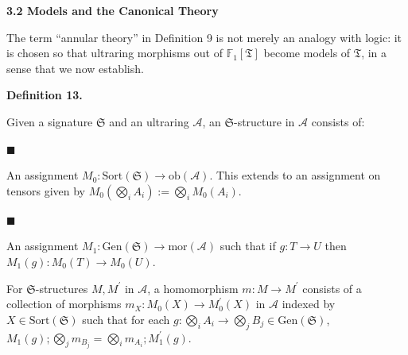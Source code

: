 \documentclass[10pt,a4paper]{amsart}
\begin{document}
 
 
 
 
\par\medskip\noindent\textbf{3.2 Models and the Canonical Theory}\par
 
 
The term “annular theory” in Definition 9 is not merely an analogy with logic: it is chosen so that ultraring morphisms out of $\mathbb{F}_{1}[\mathfrak{T}]$ become models of $\mathfrak{T}$, in a sense that we now establish.\par
 
 
 
\par\medskip\noindent\textbf{Definition 13.}\par
 
 
Given a signature $\mathfrak{S}$ and an ultraring $\mathcal{A}$, an $\mathfrak{S}$-structure in $\mathcal{A}$ consists of:\par
  
\par\noindent  $\blacksquare$ 
 
An assignment $M_{0}:\mathrm{Sort}(\mathfrak{S})\to\mathrm{ob}(\mathcal{A})$. This extends to an assignment on tensors given by $M_{0}(\bigotimes_{i}A_{i}):=\bigotimes_{i}M_{0}(A_{i})$.\par
 
 
 
\par\noindent  $\blacksquare$ 
 
An assignment $M_{1}:\mathrm{Gen}(\mathfrak{S})\to\mathrm{mor}(\mathcal{A})$ such that if $g:T\to U$ then $M_{1}(g):M_{0}(T)\to M_{0}(U)$.\par
 
 
  
For $\mathfrak{S}$-structures $M,M^{\prime}$ in $\mathcal{A}$, a homomorphism $m:M\to M^{\prime}$ consists of a collection of morphisms $m_{X}:M_{0}(X)\to M^{\prime}_{0}(X)$ in $\mathcal{A}$ indexed by $X\in\mathrm{Sort}(\mathfrak{S})$ such that for each $g:\bigotimes_{i}A_{i}\to\bigotimes_{j}B_{j}\in\mathrm{Gen}(\mathfrak{S})$, $M_{1}(g);\bigotimes_{j}m_{B_{j}}=\bigotimes_{i}m_{A_{i}};M^{\prime}_{1}(g)$.\par
 
\end{document}
